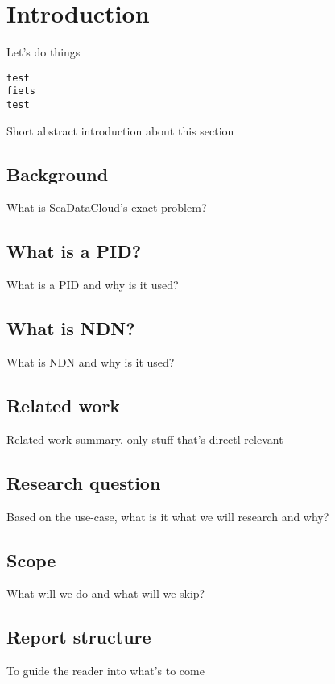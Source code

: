 \section{Introduction}
Let's do things

\begin{lstlisting}
test
fiets
test
\end{lstlisting}

Short abstract introduction about this section

\subsection{Background}
What is SeaDataCloud's exact problem?

\subsection{What is a PID?}
What is a PID and why is it used?

\subsection{What is NDN?}
What is NDN and why is it used?

\subsection{Related work}
Related work summary, only stuff that's directl relevant

\subsection{Research question}
Based on the use-case, what is it what we will research and why?

\subsection{Scope}
What will we do and what will we skip?

\subsection{Report structure}
To guide the reader into what's to come

